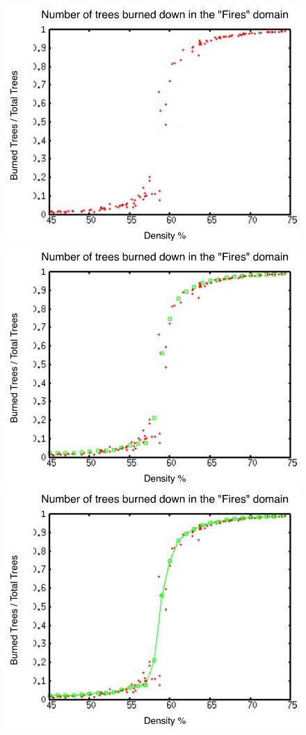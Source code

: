 \begin{figure}[ht]
\centering
\includegraphics[scale=.5]{images/rii0.pdf}
\includegraphics[scale=.5]{images/rii2.pdf}
\includegraphics[scale=.5]{images/rii3.pdf}

\end{figure}
